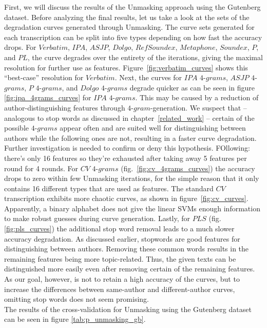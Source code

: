 First, we will discuss the results of the Unmasking approach using the Gutenberg dataset.
Before analyzing the final results, let us take a look at the sets of the degradation curves generated through Unmasking.
The curve sets generated for each transcription can be split into five types depending on how fast the accuracy drops. %
For $Verbatim$, $IPA$, $ASJP$, $Dolgo$, $RefSoundex$, $Metaphone$, $Soundex$, $P$, and $PL$, the curve degrades over the entirety of the iterations, giving the maximal resolution for further use as features.
Figure~\ref{fig:verbatim_curves} shows this ``best-case'' resolution for $Verbatim$.
Next, the curves for $IPA$ $4$-$grams$, $ASJP$ $4$-$grams$, $P$ $4$-$grams$, and $Dolgo$ $4$-$grams$ degrade quicker as can be seen in figure \ref{fig:ipa_4grams_curves} for $IPA$ $4$-$grams$.
This may be caused by a reduction of author-distinguishing features through $4$-$gram$-generation.
We suspect that -- analogous to stop words as discussed in chapter~\ref{related_work} -- certain of the possible $4$-$grams$ appear often and are suited well for distinguishing between authors while the following ones are not, resulting in a faster curve degradation.
Further investigation is needed to confirm or deny this hypothesis.
FOllowing: there's only 16 features so they're exhausted after taking away 5 features per round for 4 rounds.
For $CV$ $4$-$grams$ (fig.~\ref{fig:cv_4grams_curves}) the accuracy drops to zero within few Unmasking iterations, for the simple reason that it only contains 16 different types that are used as features.
The standard $CV$ transcription exhibits more chaotic curves, as shown in figure~\ref{fig:cv_curves}.
Apparently, a binary alphabet does not give the linear SVMs enough information to make robust guesses during curve generation.
Lastly, for $PLS$ (fig. \ref{fig:pls_curves}) the additional stop word removal leads to a much slower accuracy degradation.
As discussed earlier, stopwords are good features for distinguishing between authors.
Removing these common words results in the remaining features being more topic-related.
Thus, the given texts can be distinguished more easily even after removing certain of the remaining features.
As our goal, however, is not to retain a high accuracy of the curves, but to increase the differences between same-author and different-author curves, omitting stop words does not seem promising.\\
The results of the cross-validation for Unmasking using the Gutenberg dataset can be seen in figure \ref{tab:p_unmasking_gb}.

